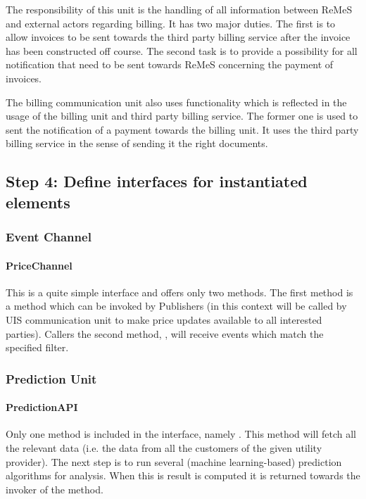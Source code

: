 \npar The responsibility of this unit is the handling of all information between
ReMeS and external actors regarding billing. It has two major duties. The first
is to allow invoices to be sent towards the third party billing service after
the invoice has been constructed off course. The second task is to provide a
possibility for all notification that need to be sent towards ReMeS concerning
the payment of invoices.

\npar The billing communication unit also uses functionality which is reflected
in the usage of the billing unit and third party billing service. The former one
is used to sent the notification of a payment towards the billing unit. It uses
the third party billing service in the sense of sending it the right documents.

\subsection{Step 4: Define interfaces for instantiated elements}
\label{add:it10/interfaces}

\subsubsection{Event Channel}

\paragraph{PriceChannel}
\npar This is a quite simple interface and offers only two methods. The first
method is a  method which can be invoked by
Publishers (in this context  will be called by UIS communication
unit to make price updates available to all interested parties). Callers the
second method, , will receive events which
match the specified filter.

\subsubsection{Prediction Unit}

\paragraph{PredictionAPI}

\npar Only one method is included in the  interface,
namely . This
method will fetch all the relevant data (i.e. the data from all the customers of
the given utility provider). The next step is to run several (machine
learning-based) prediction algorithms for analysis. When this is result is
computed it is returned towards the invoker of the method.

